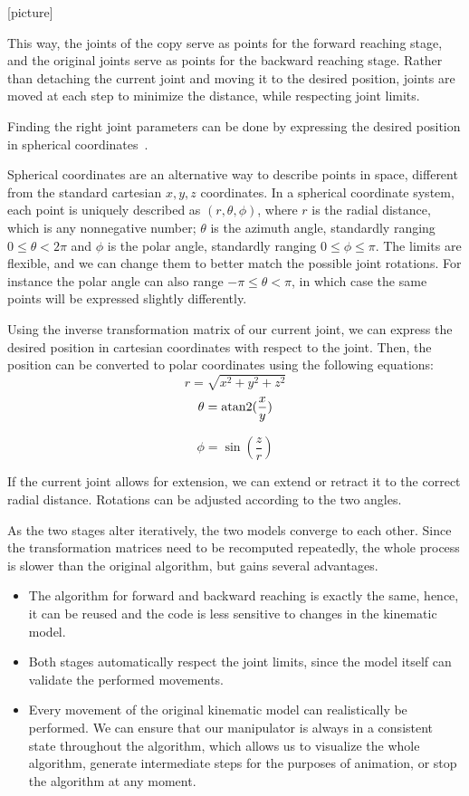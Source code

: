 [picture]

This way, the joints of the copy serve as points for the forward reaching stage, and the original joints serve as points for the backward reaching stage. Rather than detaching the current joint and moving it to the desired position, joints are moved at each step to minimize the distance, while respecting joint limits.

Finding the right joint parameters can be done by expressing the desired position in spherical coordinates~\cite{spherical}.

Spherical coordinates are an alternative way to describe points in space, different from the standard cartesian $x, y, z$ coordinates. In a spherical coordinate system, each point is uniquely described as $(r, \theta, \phi)$, where $r$ is the radial distance, which is any nonnegative number; $\theta$ is the azimuth angle, standardly ranging $0 \leq \theta < 2\pi$ and $\phi$ is the polar angle, standardly ranging $0 \leq \phi \leq \pi$. The limits are flexible, and we can change them to better match the possible joint rotations. For instance the polar angle can also range $-\pi \le \theta < \pi$, in which case the same points will be expressed slightly differently.

Using the inverse transformation matrix of our current joint, we can express the desired position in cartesian coordinates with respect to the joint. Then, the position can be converted to polar coordinates using the following equations:
\begin{equation}
  r = \sqrt{x^2 + y^2 + z^2}
\end{equation}
\begin{equation}
  \theta = \operatorname{atan2}(\frac{x}{y})
\end{equation}

\begin{equation}
  \phi = \sin(\frac{z}{r})
\end{equation}

If the current joint allows for extension, we can extend or retract it to the correct radial distance. Rotations can be adjusted according to the two angles.

As the two stages alter iteratively, the two models converge to each other. Since the transformation matrices need to be recomputed repeatedly, the whole process is slower than the original algorithm, but gains several advantages.

\begin{itemize}
  \item The algorithm for forward and backward reaching is exactly the same, hence, it can be reused and the code is less sensitive to changes in the kinematic model.
  \item Both stages automatically respect the joint limits, since the model itself can validate the performed movements.
  \item Every movement of the original kinematic model can realistically be performed. We can ensure that our manipulator is always in a consistent state throughout the algorithm, which allows us to visualize the whole algorithm, generate intermediate steps for the purposes of animation, or stop the algorithm at any moment.
\end{itemize}

